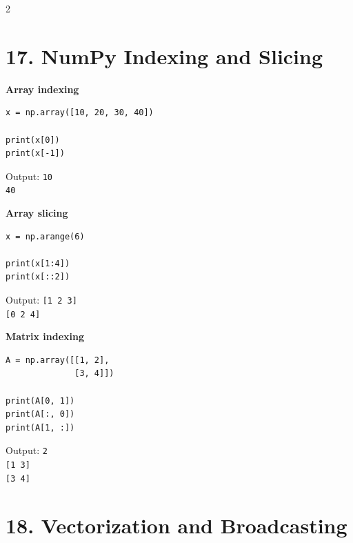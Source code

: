 \documentclass[10pt,a4paper]{article}
\begin{document}
\newpage

\begin{multicols}{2}
\raggedcolumns

\section*{17. NumPy Indexing and Slicing}

\begin{card}
\textbf{Array indexing}

\begin{lstlisting}[style=pythonstyle]
x = np.array([10, 20, 30, 40])

print(x[0])
print(x[-1])
\end{lstlisting}

Output:
\texttt{10}\\
\texttt{40}
\end{card}

\begin{card}
\textbf{Array slicing}

\begin{lstlisting}[style=pythonstyle]
x = np.arange(6)

print(x[1:4])
print(x[::2])
\end{lstlisting}

Output:
\texttt{[1 2 3]}\\
\texttt{[0 2 4]}
\end{card}

\begin{card}
\textbf{Matrix indexing}

\begin{lstlisting}[style=pythonstyle]
A = np.array([[1, 2],
              [3, 4]])

print(A[0, 1])
print(A[:, 0])
print(A[1, :])
\end{lstlisting}

Output:
\texttt{2}\\
\texttt{[1 3]}\\
\texttt{[3 4]}
\end{card}

\section*{18. Vectorization and Broadcasting}


\end{multicols}
\end{document}
